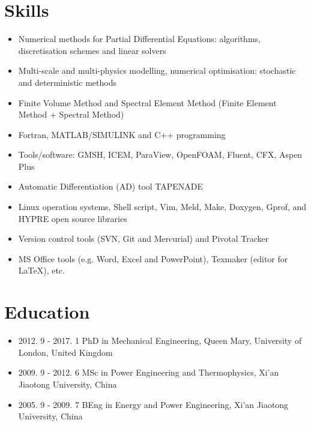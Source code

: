 \documentclass[letterpaper]{article}
\begin{document}
\section*{Skills}
\vspace{-10pt}
\begin{itemize}
\item Numerical methods for Partial Differential Equations: algorithms, discretisation schemes and linear solvers
\item Multi-scale and multi-physics modelling, numerical optimisation: stochastic and deterministic methods
\item Finite Volume Method and Spectral Element Method (Finite Element Method + Spectral Method)
\item Fortran, MATLAB/SIMULINK and C++ programming
\item Tools/software: GMSH, ICEM, ParaView, OpenFOAM, Fluent, CFX, Aspen Plus%
\item Automatic Differentiation (AD) tool TAPENADE
\item Linux operation systems, Shell script, Vim, Meld, Make, Doxygen, Gprof, and HYPRE open source libraries
\item Version control tools (SVN, Git and Mercurial) and Pivotal Tracker
\item MS Office tools (e.g. Word, Excel and PowerPoint), Texmaker (editor for \LaTeX), etc.
\end{itemize}

\vspace{-12pt}
\section*{Education}
\vspace{-10pt}
\begin{itemize}
  \item 2012. 9 - 2017. 1 \hspace{2pt} PhD in Mechanical Engineering, Queen Mary, University of London, United Kingdom
  \item 2009. 9 - 2012. 6 \hspace{2pt} MSc in Power Engineering and Thermophysics, Xi’an Jiaotong University, China
  \item 2005. 9 - 2009. 7 \hspace{2pt} BEng in Energy and Power Engineering, Xi’an Jiaotong University, China
\end{itemize}
\end{document}
